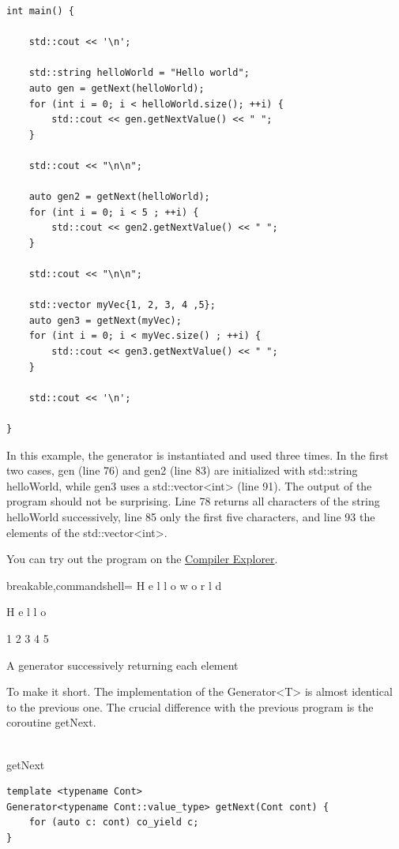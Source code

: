 \begin{lstlisting}[style=styleCXX]
int main() {

	std::cout << '\n';
	
	std::string helloWorld = "Hello world";
	auto gen = getNext(helloWorld);
	for (int i = 0; i < helloWorld.size(); ++i) {
		std::cout << gen.getNextValue() << " ";
	}
	
	std::cout << "\n\n";
	
	auto gen2 = getNext(helloWorld);
	for (int i = 0; i < 5 ; ++i) {
		std::cout << gen2.getNextValue() << " ";
	}
	
	std::cout << "\n\n";
	
	std::vector myVec{1, 2, 3, 4 ,5};
	auto gen3 = getNext(myVec);
	for (int i = 0; i < myVec.size() ; ++i) {
		std::cout << gen3.getNextValue() << " ";
	}
	
	std::cout << '\n';

}
\end{lstlisting}

In this example, the generator is instantiated and used three times. In the first two cases, gen (line 76) and gen2 (line 83) are initialized with std::string helloWorld, while gen3 uses a std::vector<int> (line 91). The output of the program should not be surprising. Line 78 returns all characters of the string helloWorld successively, line 85 only the first five characters, and line 93 the elements of the std::vector<int>.

You can try out the program on the \href{https://godbolt.org/z/j9znva}{Compiler Explorer}.

\begin{tcblisting}{breakable,commandshell={}}
H e l l o  w o r l d

H e l l o

1 2 3 4 5
\end{tcblisting}

\begin{center}
A generator successively returning each element
\end{center}

To make it short. The implementation of the Generator<T> is almost identical to the previous one. The crucial difference with the previous program is the coroutine getNext.

\hspace*{\fill} \\ %
\noindent
getNext
\begin{lstlisting}[style=styleCXX]
template <typename Cont>
Generator<typename Cont::value_type> getNext(Cont cont) {
	for (auto c: cont) co_yield c;
}
\end{lstlisting}


